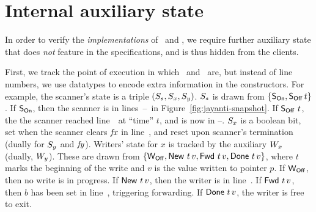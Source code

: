 \section{Internal auxiliary state}
\label{sc:auxiliaries}

In order to verify the \emph{implementations} of \jywrite~and \jyscan,
we require further auxiliary state that does \emph{not} feature in the
specifications, and is thus hidden from the clients.

First, we track the point of execution in which \jywrite~and
\jyscan~are, but instead of line numbers, we use datatypes to encode
extra information in the constructors.
%
For example, the scanner's state is a triple $(S_s, S_x,
S_y)$. $S_s$ is drawn from $\{ \mathsf{S_{On}}, \mathsf{S_{Off}}\, t\}$. If $\mathsf{S_{On}}$, then
the scanner is in lines~\lineScanSetsS--\lineScanReadsY~in
Figure~\ref{fig:jayanti-snapshot}. If $\mathsf{S_{Off}}\ t$, the the scanner
reached line~\lineScanUnsetsS~at ``time'' $t$, and is now in
\lineScanReadsFX--\lineScanRelinks. $S_x$ is a boolean bit, set when
the scanner clears $\mathit{fx}$ in line~\lineScanClearsX, and reset upon
scanner's termination (dually for $S_y$ and $\mathit{fy}$).
%
Writers' state for $x$ is tracked by the auxiliary $W_x$ (dually,
$W_y$). These are drawn from $\{\mathsf{W_{Off}}, \mathsf{New}\ t\, v, \mathsf{Fwd}\ t\,
v, \mathsf{Done}\ t\, v \}$, where $t$ marks the beginning of the write and
$v$ is the value written to pointer $p$. If $\mathsf{W_{Off}}$, then no write is
in progress. If $\mathsf{New}\ t\, v$, then the writer is in
line~\lineWrtWrt. If $\mathsf{Fwd}\ t\, v$, then $b$ has been set in
line~\lineWrtChk, triggering forwarding. If $\mathsf{Done}\ t\, v$, the
writer is free to exit.



